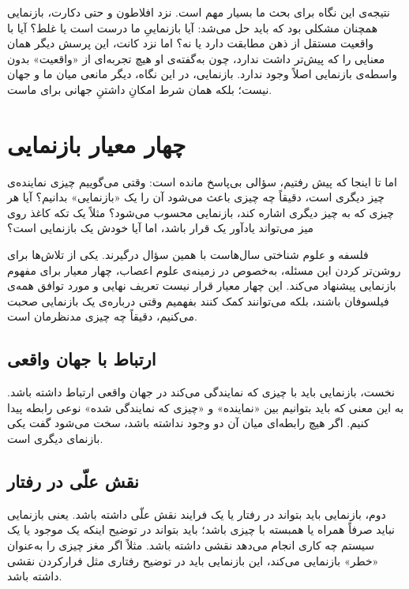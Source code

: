 نتیجه‌ی این نگاه برای بحث ما بسیار مهم است. نزد افلاطون و حتی دکارت، بازنمایی همچنان مشکلی بود که باید حل می‌شد: آیا بازنماییِ ما درست است یا غلط؟ آیا با واقعیت مستقل از ذهن مطابقت دارد یا نه؟ اما نزد کانت، این پرسش دیگر همان معنایی را که پیش‌تر داشت ندارد، چون به‌گفته‌ی او هیچ تجربه‌ای از «واقعیت» بدون واسطه‌ی بازنمایی اصلاً وجود ندارد. بازنمایی، در این نگاه، دیگر مانعی میان ما و جهان نیست؛ بلکه همان شرط امکانِ داشتنِ جهانی برای ماست.


\section{چهار معیار بازنمایی}
\label{sec:four-criteria-representation}

اما تا اینجا که پیش رفتیم، سؤالی بی‌پاسخ مانده است: وقتی می‌گوییم چیزی نماینده‌ی چیز دیگری است، دقیقاً چه چیزی باعث می‌شود آن را یک «بازنمایی» بدانیم؟ آیا هر چیزی که به چیز دیگری اشاره کند، بازنمایی محسوب می‌شود؟ مثلاً یک تکه کاغذ روی میز می‌تواند یادآور یک قرار باشد، اما آیا خودش یک بازنمایی است؟

فلسفه و علوم شناختی سال‌هاست با همین سؤال درگیرند. یکی از تلاش‌ها برای روشن‌تر کردن این مسئله، به‌خصوص در زمینه‌ی علوم اعصاب، چهار معیار برای مفهوم بازنمایی پیشنهاد می‌کند\autocite{baker2021representation}. این چهار معیار قرار نیست تعریف نهایی و مورد توافق همه‌ی فیلسوفان باشند، بلکه می‌توانند کمک کنند بفهمیم وقتی درباره‌ی یک بازنمایی صحبت می‌کنیم، دقیقاً چه چیزی مدنظرمان است.
\newpage
\subsection{ارتباط با جهان واقعی}
\label{sub:criterion-real-world-connection}

نخست، بازنمایی باید با چیزی که نمایندگی می‌کند در جهان واقعی ارتباط داشته باشد. به این معنی که باید بتوانیم بین «نماینده» و «چیزی که نمایندگی شده» نوعی رابطه پیدا کنیم. اگر هیچ رابطه‌ای میان آن دو وجود نداشته باشد، سخت می‌شود گفت یکی بازنمای دیگری است.

\subsection{نقش علّی در رفتار}
\label{sub:criterion-causal-role}

دوم، بازنمایی باید بتواند در رفتار یا یک فرایند نقش علّی داشته باشد. یعنی بازنمایی نباید صرفاً همراه یا همبسته با چیزی باشد؛ باید بتواند در توضیح اینکه یک موجود یا یک سیستم چه کاری انجام می‌دهد نقشی داشته باشد. مثلاً اگر مغز چیزی را به‌عنوان «خطر» بازنمایی می‌کند، این بازنمایی باید در توضیح رفتاری مثل فرارکردن نقشی داشته باشد.

